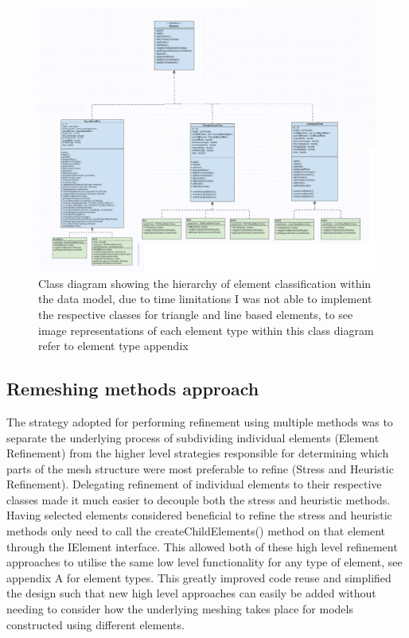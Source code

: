 \pagestyle{empty}
\begin{landscape}

\begin{figure}[h!!]                                                   
  \centerline{\includegraphics[width=150mm, scale=1]{../Graphics/ElementHigerarchyDiagram2.png}}
  \caption{Class diagram showing the hierarchy of element classification within the data model, due to time limitations I was not able to implement the respective classes for triangle and line based elements, to see image representations of each element type within this class diagram refer to element type appendix}
  \label{fig:h-refinementImp}
\end{figure}
\end{landscape}


\subsection{Remeshing methods approach}
The strategy adopted for performing refinement using multiple methods was to separate the underlying process of subdividing individual elements (Element Refinement) from the higher level strategies responsible for determining which parts of the mesh structure were most preferable to refine (Stress and Heuristic Refinement). Delegating refinement of individual elements to their respective classes made it much easier to decouple both the stress and heuristic methods. Having selected elements considered beneficial to refine the stress and heuristic methods only need to call the createChildElements() method on that element through the IElement interface. This allowed both of these high level refinement approaches to utilise the same low level functionality for any type of element, see appendix A for element types.  This greatly improved code reuse and simplified the design such that new high level approaches can easily be added without needing to consider how the underlying meshing takes place for models constructed using different elements. \\ 

